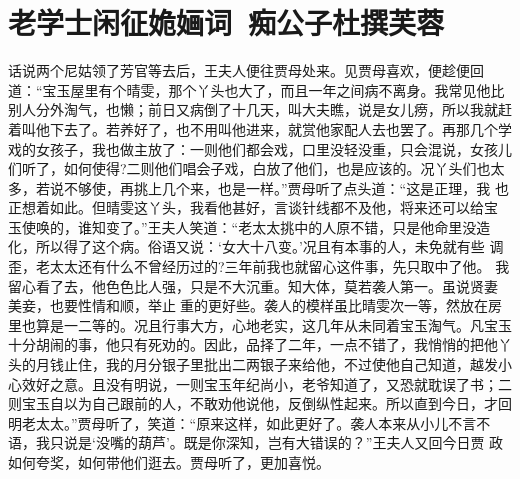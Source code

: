 \chapter{老学士闲征姽婳词~痴公子杜撰芙蓉}

话说两个尼姑领了芳官等去后，王夫人便往贾母处来。见贾母喜欢，便趁便回
道：“宝玉屋里有个晴雯，那个丫头也大了，而且一年之间病不离身。我常见他比
别人分外淘气，也懒；前日又病倒了十几天，叫大夫瞧，说是女儿痨，所以我就赶
着叫他下去了。若养好了，也不用叫他进来，就赏他家配人去也罢了。再那几个学
戏的女孩子，我也做主放了：一则他们都会戏，口里没轻没重，只会混说，女孩儿
们听了，如何使得?二则他们唱会子戏，白放了他们，也是应该的。况丫头们也太
多，若说不够使，再挑上几个来，也是一样。”贾母听了点头道：“这是正理，我
也正想着如此。但晴雯这丫头，我看他甚好，言谈针线都不及他，将来还可以给宝
玉使唤的，谁知变了。”王夫人笑道：“老太太挑中的人原不错，只是他命里没造
化，所以得了这个病。俗语又说：‘女大十八变。’况且有本事的人，未免就有些
调歪，老太太还有什么不曾经历过的?三年前我也就留心这件事，先只取中了他。
我留心看了去，他色色比人强，只是不大沉重。知大体，莫若袭人第一。虽说贤妻
美妾，也要性情和顺，举止重的更好些。袭人的模样虽比晴雯次一等，然放在房
里也算是一二等的。况且行事大方，心地老实，这几年从未同着宝玉淘气。凡宝玉
十分胡闹的事，他只有死劝的。因此，品择了二年，一点不错了，我悄悄的把他丫
头的月钱止住，我的月分银子里批出二两银子来给他，不过使他自己知道，越发小
心效好之意。且没有明说，一则宝玉年纪尚小，老爷知道了，又恐就耽误了书；二
则宝玉自以为自己跟前的人，不敢劝他说他，反倒纵性起来。所以直到今日，才回
明老太太。”贾母听了，笑道：“原来这样，如此更好了。袭人本来从小儿不言不
语，我只说是‘没嘴的葫芦’。既是你深知，岂有大错误的？”王夫人又回今日贾
政如何夸奖，如何带他们逛去。贾母听了，更加喜悦。

